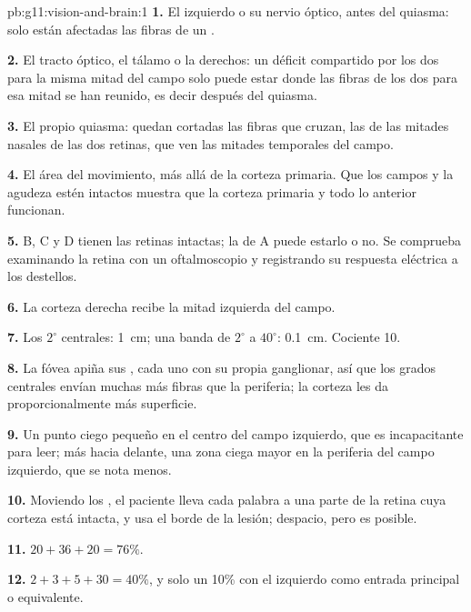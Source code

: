 \begin{solution}{pb:g11:vision-and-brain:1}
\textbf{1.} El  izquierdo o su nervio óptico, antes del quiasma:
solo están afectadas las fibras de un .

\textbf{2.} El tracto óptico, el tálamo o la  derechos:
un déficit compartido por los dos  para la misma mitad del campo
solo puede estar donde las fibras de los dos  para esa mitad se han
reunido, es decir después del quiasma.

\textbf{3.} El propio quiasma: quedan cortadas las fibras que cruzan,
las de las mitades nasales de las dos retinas, que ven las mitades
temporales del campo.

\textbf{4.} El área del movimiento, más allá de la corteza primaria.
Que los campos y la agudeza estén intactos muestra que la corteza
primaria y todo lo anterior funcionan.

\textbf{5.} B, C y D tienen las retinas intactas; la de A puede estarlo
o no. Se comprueba examinando la retina con un oftalmoscopio y
registrando su respuesta eléctrica a los destellos.

\textbf{6.} La corteza derecha recibe la mitad izquierda del campo.

\textbf{7.} Los $2^\circ$ centrales: \qty{1}{cm}; una banda de
$2^\circ$ a $40^\circ$: \qty{0.1}{cm}. Cociente 10.

\textbf{8.} La fóvea apiña sus , cada uno con su propia 
ganglionar, así que los grados centrales envían muchas más fibras que
la periferia; la corteza les da proporcionalmente más superficie.

\textbf{9.} Un punto ciego pequeño en el centro del campo izquierdo,
que es incapacitante para leer; más hacia delante, una zona ciega mayor
en la periferia del campo izquierdo, que se nota menos.

\textbf{10.} Moviendo los , el paciente lleva cada palabra a una
parte de la retina cuya corteza está intacta, y usa el borde de la
lesión; despacio, pero es posible.

\textbf{11.} $20 + 36 + 20 = 76\%$.

\textbf{12.} $2 + 3 + 5 + 30 = 40\%$, y solo un 10\% con el 
izquierdo como entrada principal o equivalente.


\end{solution}
